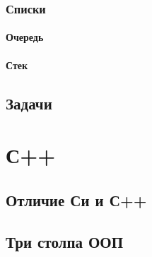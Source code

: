 \documentclass{bmstu}
\begin{document}
\subsection{Списки}
\subsubsection{Очередь}
\subsubsection{Стек}
\section{Задачи}

\chapter{С++}
\section{Отличие Си и С++}
\section{Три столпа ООП}
\section{}
\end{document}

